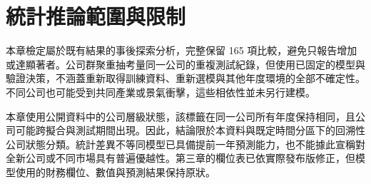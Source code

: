 \section{統計推論範圍與限制}

本章檢定屬於既有結果的事後探索分析，完整保留 165 項比較，避免只報告增加或達顯著者。公司群聚重抽考量同一公司的重複測試紀錄，但使用已固定的模型與驗證決策，不涵蓋重新取得訓練資料、重新選模與其他年度環境的全部不確定性。不同公司也可能受到共同產業或景氣衝擊，這些相依性並未另行建模。

本章使用公開資料中的公司層級狀態，該標籤在同一公司所有年度保持相同，且公司可能跨擬合與測試期間出現。因此，結論限於本資料與既定時間分區下的回溯性公司狀態分類。統計差異不等同模型已具備提前一年預測能力，也不能據此宣稱對全新公司或不同市場具有普遍優越性。第三章的欄位表已依實際發布版修正，但模型使用的財務欄位、數值與預測結果保持原狀。
\endgroup

